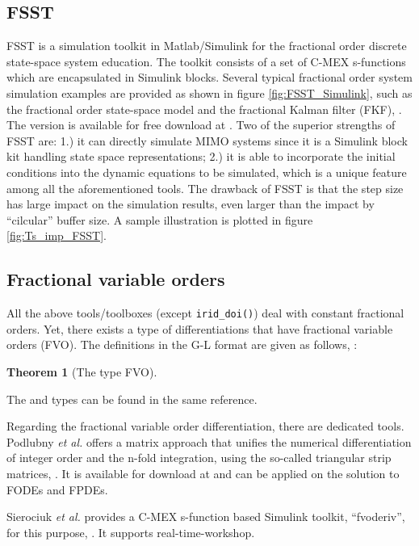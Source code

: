 \documentclass[11pt]{tCON2e}
\theoremstyle{plain}\newtheorem{theorem}{Theorem}
\theoremstyle{definition}
\theoremstyle{remark}
\begin{document}
\subsection{FSST}
FSST is a simulation toolkit in Matlab/Simulink for the fractional order discrete state-space system education. The toolkit consists of a set of C-MEX s-functions which are encapsulated in Simulink blocks. Several typical fractional order system simulation examples are provided as shown in figure \ref{fig:FSST_Simulink}, such as the fractional order state-space model and the fractional Kalman filter (FKF), \cite{ref:fsst_Dominik_IFAC}. The version  is available for free download at \cite{ref:fsst_1_7}.
Two of the superior strengths of FSST are: 1.) it can directly simulate MIMO systems since it is a Simulink block kit handling state space representations; 2.) it is able to incorporate the initial conditions into the dynamic equations to be simulated, which is a unique feature among all the aforementioned tools. The drawback of FSST is that the step size has large impact on the simulation results, even larger than the impact by ``cilcular'' buffer size. A sample illustration is plotted in figure \ref{fig:Ts_imp_FSST}.






\subsection{Fractional variable orders}
All the above tools/toolboxes (except {\tt irid\_doi()}) deal with constant fractional orders. Yet, there exists a type of differentiations that have fractional variable orders (FVO). The definitions in the G-L format are given as follows, \cite{ref:FVO_Lorenzo}:
\begin{theorem}[The  type FVO]

\end{theorem}
\noindent
The  and  types can be found in the same reference.

Regarding the fractional variable order differentiation, there are dedicated tools.
Podlubny \emph{et al.} offers a matrix approach that unifies the numerical differentiation of integer order and the n-fold integration, using the so-called triangular strip matrices,
\cite{ref:Igor_matrix_approach}. It is available for download at \cite{ref:Igor_matrix_approach_download} and can be applied on the solution to FODEs and FPDEs.

Sierociuk \emph{et al.} provides a C-MEX s-function based Simulink toolkit, ``fvoderiv'', for this purpose, \cite{ref:fvoderiv_Dominik}. It supports real-time-workshop.
\end{document}
